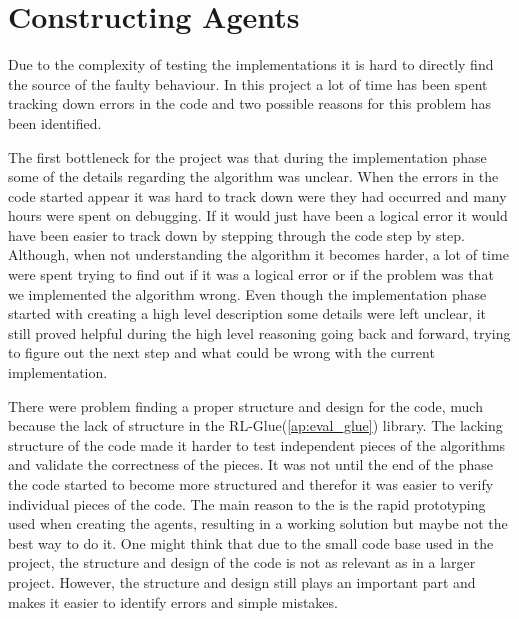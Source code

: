 \section{Constructing Agents}
\label{ap:constructing_experiments}
Due to the complexity of testing the implementations it is hard to directly find the source of the faulty behaviour. In this project a lot of time has been spent tracking down errors in the code and two possible reasons for this problem has been identified.

The first bottleneck for the project was that during the implementation phase some of the details regarding the algorithm was unclear. When the errors in the code started appear it was hard to track down were they had occurred and many hours were spent on debugging. If it would just have been a logical error it would have been easier to track down by stepping through the code step by step. Although, when not understanding the algorithm it becomes harder, a lot of time were spent trying to find out if it was a logical error or if the problem was that we implemented the algorithm wrong. Even though the implementation phase started with creating a high level description some details were left unclear, it still proved helpful during the high level reasoning going back and forward, trying to figure out the next step and what could be wrong with the current implementation.

There were problem finding a proper structure and design for the code, much because the lack of structure in the RL-Glue(\ref{ap:eval_glue}) library. The lacking structure of the code made it harder to test independent pieces of the algorithms and validate the correctness of the pieces. It was not until the end of the phase the code started to become more structured and therefor it was easier to verify individual pieces of the code. The main reason to the  is the rapid prototyping used when creating the agents, resulting in a working solution but maybe not the best way to do it. One might think that due to the small code base used in the project, the structure and design of the code is not as relevant as in a larger project. However, the structure and design still plays an important part and makes it easier to identify errors and simple mistakes.